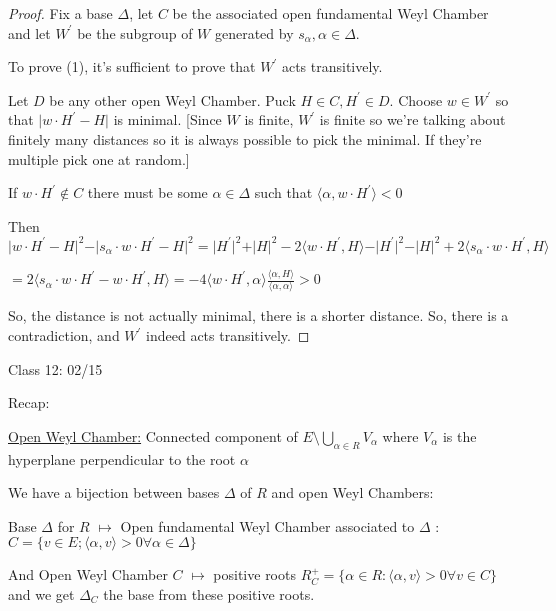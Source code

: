 \documentclass{article}
\theoremstyle{definition}
\begin{document}
\begin{proof}
    Fix a base \(\Delta\), let \(C\) be the associated open fundamental Weyl Chamber and let \(W^{\prime}\) be the subgroup of \(W\) generated by \(s_\alpha,\alpha \in \Delta\).

    To prove (1), it's sufficient to prove that \(W^{\prime} \) acts transitively.

    Let \(D\) be any other open Weyl Chamber. Puck \(H\in C,H^{\prime} \in D\). Choose \(w\in W^{\prime} \) so that \(\vert w\cdot H^{\prime} - H \vert \) is minimal. [Since \(W\) is finite, \(W^{\prime} \) is finite so we're talking about finitely many distances so it is always possible to pick the minimal. If they're multiple pick one at random.]

    If \(w\cdot H^{\prime} \notin C\) there must be some \(\alpha \in \Delta \) such that \(\langle \alpha ,w\cdot H^{\prime}  \rangle < 0\) 

    Then \(\vert w\cdot H^{\prime} - H \vert ^2 - \vert s_\alpha \cdot w\cdot H^{\prime} - H \vert ^2 = \vert H^{\prime} \vert ^2 + \vert H \vert ^2 - 2 \langle w\cdot H^{\prime} ,H \rangle - \vert H^{\prime}  \vert ^2 - \vert H \vert ^2 + 2 \langle s_\alpha \cdot w \cdot H^{\prime} , H \rangle \) 

    \(= 2 \langle s_\alpha \cdot w \cdot H^{\prime}  - w \cdot H^{\prime} , H \rangle = -4 \langle w\cdot H^{\prime} ,\alpha  \rangle \frac{\langle \alpha ,H \rangle }{\langle \alpha ,\alpha  \rangle } > 0\) 

    So, the distance is not actually minimal, there is a shorter distance. So, there is a contradiction, and \(W^{\prime}\) indeed acts transitively.

\end{proof}

\hrulefill

Class 12: 02/15

Recap:

\underline{Open Weyl Chamber:} Connected component of \(E \setminus \bigcup_{\alpha\in R}^{} V_\alpha\) where \(V_\alpha\) is the hyperplane perpendicular to the root \(\alpha\) 

We have a bijection between bases \(\Delta\) of \(R\) and open Weyl Chambers:

Base \(\Delta\) for \(R\) \(\mapsto\) Open fundamental Weyl Chamber associated to \(\Delta\) : \(C = \{ v\in E; \langle \alpha , v \rangle > 0 \forall \alpha \in \Delta \} \) 

And Open Weyl Chamber \(C\) \(\mapsto\)  positive roots \(R_C^+ = \{ \alpha \in R : \langle \alpha ,v \rangle > 0 \forall v\in C \} \) and we get \(\Delta_C\) the base from these positive roots.
\end{document}
